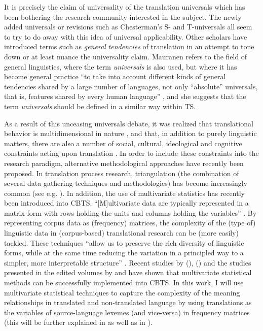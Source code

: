 It is precisely the claim of universality of the translation universals which has been bothering the research community interested in the subject. The newly added universals or revisions such as Chesterman’s S- and T-universals all seem to try to do away with this idea of universal applicability. Other scholars have introduced terms such as \textit{general} \textit{tendencies} of translation in an attempt to tone down or at least nuance the universality claim. Mauranen refers to the field of general linguistics, where the term \textit{universals} is also used, but where it has become general practice “to take into account different kinds of general tendencies shared by a large number of languages, not only ``absolute'' universals, that is, features shared by every human language” \citep[35]{anderman_universal_2008}, and she suggests that the term \textit{universals} should be defined in a similar way within TS.

As a result of this unceasing universals debate, it was realized that translational behavior is multidimensional in nature \citep{de_sutter_inevitability_2013}, and that, in addition to purely linguistic matters, there are also a number of social, cultural, ideological and cognitive constraints acting upon translation \citep{baker_role_1999}. In order to include these constraints into the research paradigm, alternative methodological approaches have recently been proposed. In translation process research, triangulation (the combination of several data gathering techniques and methodologies) has become increasingly common (see e.g. \citealt{alves_foreword._2003,carl_triangulating_2010,shreve_integrative_2010}). In addition, the use of multivariate statistics has recently been introduced into CBTS. “[M]ultivariate data are typically represented in a matrix form with rows holding the units and columns holding the variables” \citep[302]{meng_multivariate_2012}. By representing corpus data as (frequency) matrices, the complexity of the (type of) linguistic data in (corpus-based) translational research can be (more easily) tackled. These techniques “allow us to preserve the rich diversity of linguistic forms, while at the same time reducing the variation in a principled way to a simpler, more interpretable structure” \citep[301]{meng_multivariate_2012}. Recent studies by \citeauthor{delaere_is_2012} (\citeyear*{delaere_is_2012}), \citeauthor{szmrecsanyi_weakly_2014} (\citeyear*{szmrecsanyi_weakly_2014}) and the studies presented in the edited volumes by \citet{oakes_quantitative_2012} and \citet{DeSutterEtAl2017} have shown that multivariate statistical methods can be successfully implemented into CBTS. In this work, I will use multivariate statistical techniques to capture the complexity of the meaning relationships in translated and non-translated language by using translations as the variables of source-language lexemes (and vice-versa) in frequency matrices (this will be further explained in  as well as in ).

